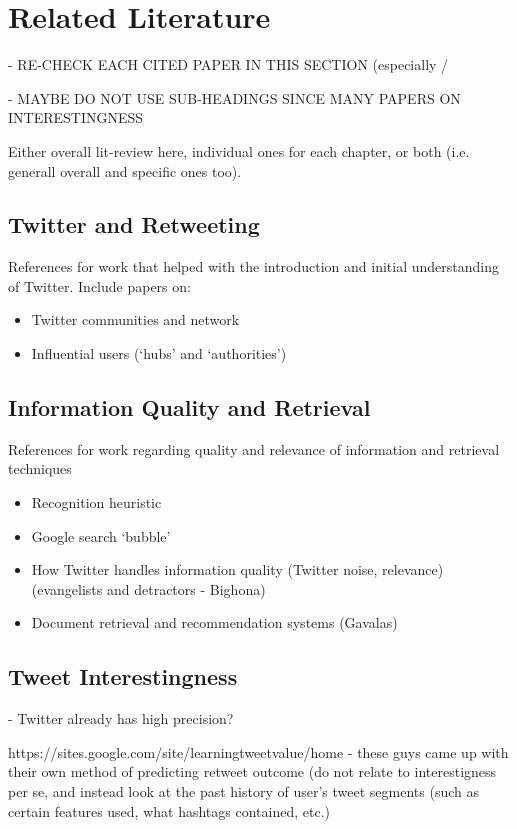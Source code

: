 \chapter{Related Literature}

- RE-CHECK EACH CITED PAPER IN THIS SECTION (especially /

- MAYBE DO NOT USE SUB-HEADINGS SINCE MANY PAPERS ON INTERESTINGNESS

Either overall lit-review here, individual ones for each chapter, or both (i.e. generall overall and specific ones too).

\section{Twitter and Retweeting}
References for work that helped with the introduction and initial understanding of Twitter. Include papers on:
\begin{itemize}
\item Twitter communities and network
\item Influential users (`hubs' and `authorities')
\end{itemize}

\section{Information Quality and Retrieval}
References for work regarding quality and relevance of information and retrieval techniques
\begin{itemize}
\item Recognition heuristic
\item Google search `bubble'
\item How Twitter handles information quality (Twitter noise, relevance) (evangelists and detractors - Bighona)
\item Document retrieval and recommendation systems (Gavalas)
\end{itemize}

\section{Tweet Interestingness}

\cite{zadeh13} - Twitter already has high precision?

https://sites.google.com/site/learningtweetvalue/home - these guys came up with their own method of predicting retweet outcome (do not relate to interestigness per se, and instead look at the past history of user's tweet segments (such as certain features used, what hashtags contained, etc.)
